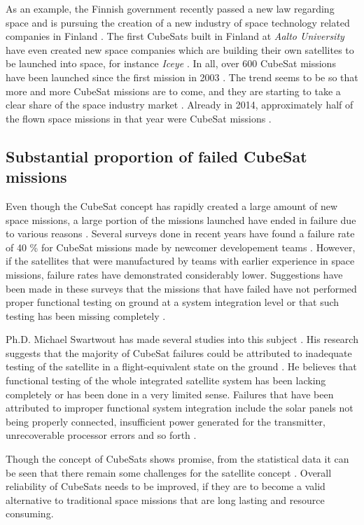 \documentclass[english,12pt,a4paper,pdftex,elec,utf8]{aaltothesis}
\begin{document}
As an example, the Finnish government recently passed a new law regarding space and is pursuing the creation of a new industry of space technology related companies in Finland \cite{filaw}. The first CubeSats built in Finland at \textit{Aalto University} have even created new space companies which are building their own satellites to be launched into space, for instance \textit{Iceye} \cite{iceye}. In all, over 600 CubeSat missions have been launched since the first mission in 2003 \cite{Swart2017kalvo}. The trend seems to be so that more and more CubeSat missions are to come, and they are starting to take a clear share of the space industry market \cite{SpaceWorks2017}. Already in 2014, approximately half of the flown space missions in that year were CubeSat missions \cite{Swart2016}.\par 
\subsection{Substantial proportion of failed CubeSat missions}
Even though the CubeSat concept has rapidly created a large amount of new space missions, a large portion of the missions launched have ended in failure due to various reasons \cite{Swart2016, Langer}. Several surveys done in recent years have found a failure rate of 40 \% for CubeSat missions made by newcomer developement teams \cite{Swart2016, Langer, Swart1, Swart2015}. However, if the satellites that were manufactured by teams with earlier experience in space missions, failure rates have demonstrated considerably lower. Suggestions have been made in these surveys that the missions that have failed have not performed proper functional testing on ground at a system integration level or that such testing has been missing completely \cite{Swart2016, Langer, Swart1}.\par
Ph.D. Michael Swartwout has made several studies into this subject \cite{Swart2017kalvo}. His research suggests that the majority of CubeSat failures could be attributed to inadequate testing of the satellite in a flight-equivalent state on the ground \cite{Swart2016, Swart1, Swart2015}. He believes that functional testing of the whole integrated satellite system has been lacking completely or has been done in a very limited sense. Failures that have been attributed to improper functional system integration include the solar panels not being properly connected, insufficient power generated for the transmitter, unrecoverable processor errors and so forth \cite{Swart1}. \par
Though the concept of CubeSats shows promise, from the statistical data it can be seen that there remain some challenges for the satellite concept \cite{Swart2017kalvo, Swart2016, Langer, Swart1, Swart2015}. Overall reliability of CubeSats needs to be improved, if they are to become a valid alternative to traditional space missions that are long lasting and resource consuming.\par 
\end{document}

